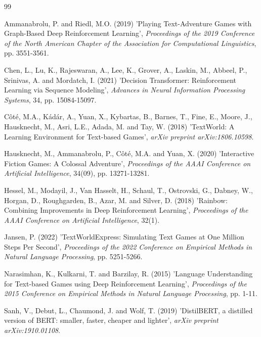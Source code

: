 \documentclass[11pt,a4paper]{article}
\begin{document}
\newpage
\begin{thebibliography}{99}

 Ammanabrolu, P. and Riedl, M.O. (2019) 'Playing Text-Adventure Games with Graph-Based Deep Reinforcement Learning', \textit{Proceedings of the 2019 Conference of the North American Chapter of the Association for Computational Linguistics}, pp. 3551-3561.

 Chen, L., Lu, K., Rajeswaran, A., Lee, K., Grover, A., Laskin, M., Abbeel, P., Srinivas, A. and Mordatch, I. (2021) 'Decision Transformer: Reinforcement Learning via Sequence Modeling', \textit{Advances in Neural Information Processing Systems}, 34, pp. 15084-15097.

 Côté, M.A., Kádár, A., Yuan, X., Kybartas, B., Barnes, T., Fine, E., Moore, J., Hausknecht, M., Asri, L.E., Adada, M. and Tay, W. (2018) 'TextWorld: A Learning Environment for Text-based Games', \textit{arXiv preprint arXiv:1806.10598}.

 Hausknecht, M., Ammanabrolu, P., Côté, M.A. and Yuan, X. (2020) 'Interactive Fiction Games: A Colossal Adventure', \textit{Proceedings of the AAAI Conference on Artificial Intelligence}, 34(09), pp. 13271-13281.

 Hessel, M., Modayil, J., Van Hasselt, H., Schaul, T., Ostrovski, G., Dabney, W., Horgan, D., Roughgarden, B., Azar, M. and Silver, D. (2018) 'Rainbow: Combining Improvements in Deep Reinforcement Learning', \textit{Proceedings of the AAAI Conference on Artificial Intelligence}, 32(1).

 Jansen, P. (2022) 'TextWorldExpress: Simulating Text Games at One Million Steps Per Second', \textit{Proceedings of the 2022 Conference on Empirical Methods in Natural Language Processing}, pp. 5251-5266.

 Narasimhan, K., Kulkarni, T. and Barzilay, R. (2015) 'Language Understanding for Text-based Games using Deep Reinforcement Learning', \textit{Proceedings of the 2015 Conference on Empirical Methods in Natural Language Processing}, pp. 1-11.

 Sanh, V., Debut, L., Chaumond, J. and Wolf, T. (2019) 'DistilBERT, a distilled version of BERT: smaller, faster, cheaper and lighter', \textit{arXiv preprint arXiv:1910.01108}.


\end{thebibliography}
\end{document}
